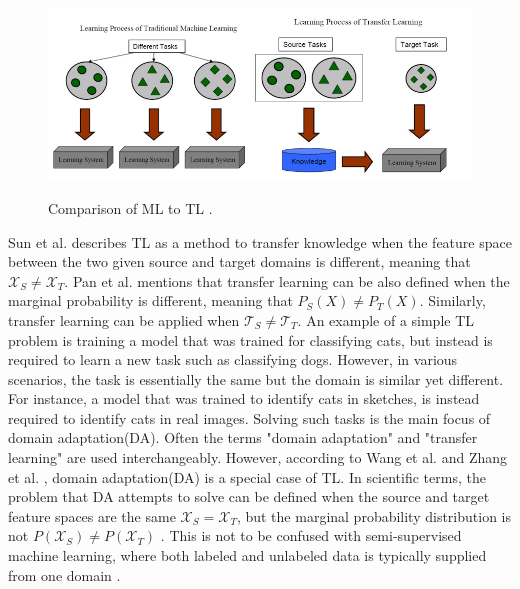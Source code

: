 \documentclass[english, 12pt, a4paper, elec, utf8, a-1b, online]{aaltothesis}
\begin{document}
 
\begin{figure}[htb]
	\begin{center}
		\includegraphics[width=16cm]{./TL.png}
	\end{center}
	\caption{Comparison of ML to TL \cite{Pan2010}.}
	\begin{center}
		\label{TL}
	\end{center}
\end{figure}
\FloatBarrier

Sun et al. \cite{SUN201584} describes TL as a method to transfer knowledge when the feature space between the two given source and target domains is different, meaning that $\mathcal{X}_{S} \neq \mathcal{X}_{T}$. Pan et al. \cite{Pan2010} mentions that transfer learning can be also defined when the marginal probability is different, meaning that $P_{S}(X) \neq P_{T}(X)$. Similarly, transfer learning can be applied when $\mathcal{T}_{S} \neq \mathcal{T}_{T}$. An example of a simple TL problem is training a model that was trained for classifying cats, but instead is  required to learn a new task such as classifying dogs. However, in various scenarios, the task is essentially the same but the domain is similar yet different. For instance, a model that was trained to identify cats in sketches, is instead required to identify cats in real images. Solving such tasks is the main focus of domain adaptation(DA). Often the terms "domain adaptation" and "transfer learning" are used interchangeably. However, according to Wang et al. \cite{Wang2018} and Zhang et al. \cite{Zhang2021}, domain adaptation(DA) is a special case of TL. In scientific terms, the problem that DA attempts to solve can be defined when the source and target feature spaces are the same $\mathcal{X}_{S}=\mathcal{X}_{T}$, but the marginal probability distribution is not $P\left(\mathcal{X}_{S}\right) \neq P\left(\mathcal{X}_{T}\right)$ \cite{SUN201584}. This is not to be confused with semi-supervised machine learning, where both labeled and unlabeled data is typically supplied from one domain \cite{SUN201584}. 
\end{document}
